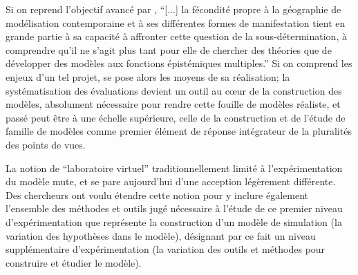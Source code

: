 {Si on reprend l'objectif avancé par \autocite{Varenne2014}, \enquote{[...] la fécondité propre à la géographie de modélisation contemporaine et à ses différentes formes de manifestation tient en grande partie à sa capacité à affronter cette question de la sous-détermination, à comprendre qu’il ne s’agit plus tant pour elle de chercher des théories que de développer des modèles aux fonctions épistémiques multiples.} Si on comprend les enjeux d'un tel projet, se pose alors les moyens de sa réalisation; la systématisation des évaluations devient un outil au cœur de la construction des modèles, absolument nécessaire pour rendre cette fouille de modèles réaliste, et passé peut être à une échelle supérieure, celle de la construction et de l'étude de famille de modèles comme premier élément de réponse intégrateur de la pluralités des points de vues.

La notion de \enquote{laboratoire virtuel} traditionnellement limité à l'expérimentation du modèle mute, et se pare aujourd'hui d'une acception légèrement différente. Des chercheurs \autocite{Schmitt2014} \autocite{Amblard2003} ont voulu étendre cette notion pour y inclure également l'ensemble des méthodes et outils jugé nécessaire à l'étude de ce premier niveau d'expérimentation que représente la construction d'un modèle de simulation (la variation des hypothèses dans le modèle), désignant par ce fait un niveau supplémentaire d’expérimentation (la variation des outils et méthodes pour construire et étudier le modèle). 



}
